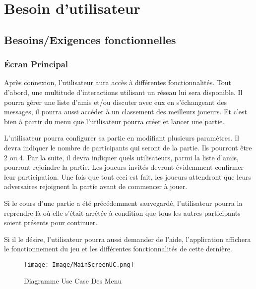 \documentclass[french, utf8]{article}
\begin{document}
\newpage
\section{Besoin d'utilisateur}

\subsection{Besoins/Exigences fonctionnelles}

\subsubsection{Écran Principal}
\label{sec:MenuPrincipalUser}
Après connexion, l'utilisateur aura accès à différentes fonctionnalités. Tout d'abord, une multitude d'interactions utilisant un réseau lui sera disponible. Il pourra gérer une liste d'amis et/ou discuter avec eux en s'échangeant des messages, il pourra aussi accéder à un classement des meilleurs joueurs. Et c'est bien à partir du menu que l'utilisateur pourra créer et lancer une partie. \newline

L'utilisateur pourra configurer sa partie en modifiant plusieurs paramètres. Il devra indiquer le nombre de participants qui seront de la partie. Ils pourront être 2 ou 4. Par la suite, il devra indiquer quels utilisateurs, parmi la liste d'amis, pourront rejoindre la partie. Les joueurs invités devront évidemment confirmer leur participation. Une fois que tout ceci est fait, les joueurs attendront que leurs adversaires rejoignent la partie avant de commencer à jouer. \newline

Si le cours d'une partie a été précédemment sauvegardé, l'utilisateur pourra la reprendre là où elle s'était arrêtée à condition que tous les autres participants soient présents pour continuer.

Si il le désire, l'utilisateur pourra aussi demander de l'aide, l'application affichera le fonctionnement du jeu et les différentes fonctionnalités de cette dernière.


\begin{figure}[ht]
     \centering
    \texttt{[image: Image/MainScreenUC.png]}
\caption{Diagramme Use Case Des Menu}
\end{figure}
\end{document}
